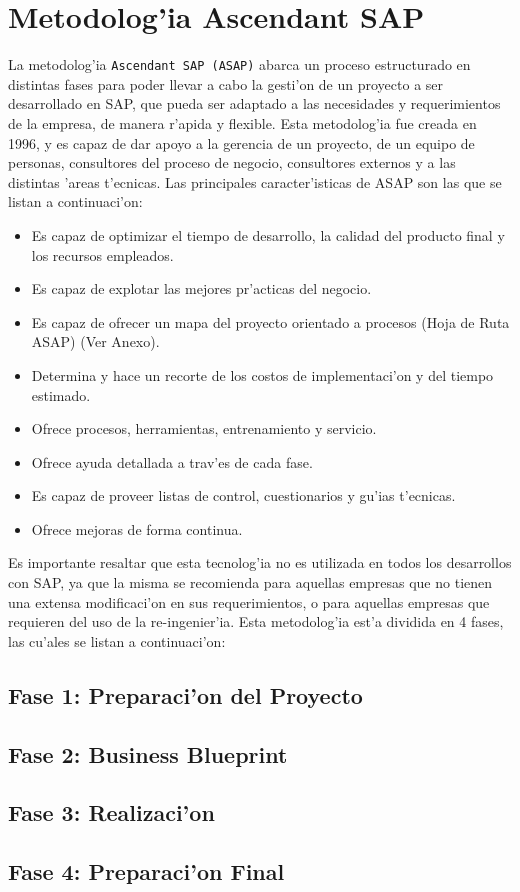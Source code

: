 \section{Metodolog'ia Ascendant SAP}
La metodolog'ia \texttt{Ascendant SAP (ASAP)} abarca un proceso estructurado en distintas fases para poder llevar a cabo la gesti'on de un proyecto a ser desarrollado  en SAP, que pueda ser adaptado a las necesidades y requerimientos de la empresa, de manera r'apida y flexible. Esta metodolog'ia fue creada en 1996, y es capaz de dar apoyo a la gerencia de un proyecto, de un equipo de personas, consultores del proceso de negocio, consultores externos y a las distintas 'areas t'ecnicas.
Las principales caracter'isticas de ASAP son las que se listan a continuaci'on:
\begin{itemize}
\item Es capaz de optimizar el tiempo de desarrollo, la calidad del producto final y los recursos empleados.
\item Es capaz de explotar las mejores pr'acticas del negocio.
\item Es capaz de ofrecer un mapa del proyecto orientado a procesos (Hoja de Ruta ASAP) (Ver Anexo).
\item Determina y hace un recorte de los costos de implementaci'on y del tiempo estimado.
\item Ofrece procesos, herramientas, entrenamiento y servicio.
\item Ofrece ayuda detallada a trav'es de cada fase.
\item Es capaz de proveer listas de control, cuestionarios y gu'ias t'ecnicas.
\item Ofrece mejoras de forma continua.
\end{itemize}
Es importante resaltar que esta tecnolog'ia no es utilizada en todos los desarrollos con SAP, ya que la misma se recomienda para aquellas empresas que no tienen una extensa modificaci'on en sus requerimientos, o para aquellas empresas que requieren del uso de la re-ingenier'ia.
Esta metodolog'ia est'a dividida en 4 fases, las cu'ales se listan a continuaci'on:
\subsection{Fase 1: Preparaci'on del Proyecto}
\subsection{Fase 2: Business Blueprint}
\subsection{Fase 3: Realizaci'on}
\subsection{Fase 4: Preparaci'on Final}

